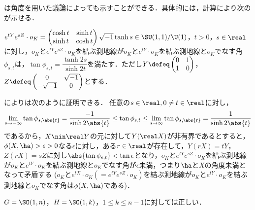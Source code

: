 \begin{rem}\label{rem:su11-by-angle}

  は角度を用いた議論によっても示すことができる．具体的には，計算により次のが示せる．
  \begin{lem}\label{lem:0106}
    $e^{tY}e^{s Z}\cdot o_K =
    \begin{pmatrix}
      \cosh t & \sinh t\\ \sinh t & \cosh t
    \end{pmatrix}
    \sqrt{-1}\tanh s \in \SU(1,1)/\U(1) $，$t > 0$，$s\in \real$に対し，$o_K $と$e^{tY}e^{sZ}\cdot o_K$を結ぶ測地線が$o_K$と$e^{tY}\cdot o_K $を結ぶ測地線と$o_K$でなす角$\phi_{s,t} $は，$\tan \phi_{s,t} = \dfrac{\tanh 2s}{\sinh 2t} $を満たす．ただし$Y \defeq
  \begin{pmatrix}
    0 & 1\\ 1 & 0
  \end{pmatrix}
  $，$Z \defeq \begin{pmatrix}
    0 & \sqrt{-1} \\ -\sqrt{-1} & 0
  \end{pmatrix}$とする．
  \end{lem}  

  によりは次のように証明できる．
  任意の$s\in \real, 0\neq t\in \real $に対し，
  \begin{align*}
    \lim_{s\to -\infty}\tan \phi_{s,\abs{t}} = \dfrac{-1}{\sinh 2\abs{t}}  \leq \tan \phi_{s,t} \leq  \lim_{s\to \infty}\tan \phi_{s,\abs{t}} = \dfrac{1}{\sinh 2\abs{t}}
  \end{align*}
  であるから，$X\nin \real Y $の元に対して$Y(\real X) $が非有界であるとすると，$\phi(X,\ha) >  \epsilon > 0$なる$\epsilon$に対し，ある$r\in \real $が存在して，$Y(rX) = tY $，$Z(rX) = sZ $に対し$\abs{\tan \phi_{s,t}} < \tan \epsilon $となり，$o_K$と$e^{tY}e^{sZ}\cdot o_K$を結ぶ測地線が$o_K$と$e^{tY}\cdot o_K $を結ぶ測地線と$o_K$でなす角が$\epsilon$未満，つまり$\ha$と$X$の角度未満となって矛盾する ($o_K$と$e^{tX}\cdot o_K (= e^{tY}e^{sZ}\cdot o_K)  $を結ぶ測地線が$o_K$と$e^{tY}\cdot o_K $を結ぶ測地線と$o_K$でなす角は$\phi(X,\ha)$である)．

  
\end{rem}

\begin{cor}\label{cor:yosou-eg}
  $G = \SO(1,n) $，$H = \SO(1,k) $，$1\leq k\leq n-1$に対しては正しい．
\end{cor}


